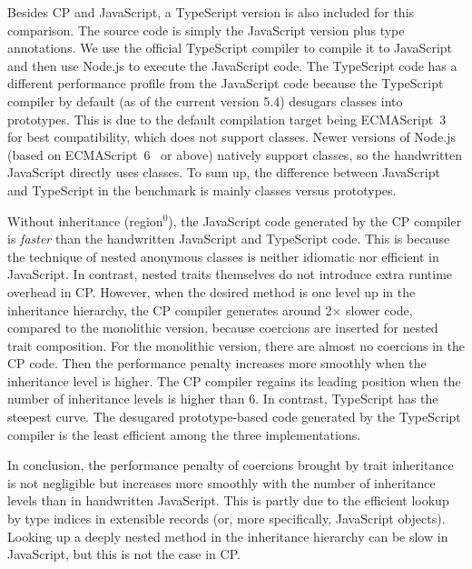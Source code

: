 Besides CP and JavaScript, a TypeScript version is also included for this
comparison. The source code is simply the JavaScript version plus type
annotations. We use the official TypeScript compiler to compile it to JavaScript
and then use Node.js to execute the JavaScript code. The TypeScript code has a
different performance profile from the JavaScript code because the TypeScript
compiler by default (as of the current version 5.4) desugars classes into
prototypes. This is due to the default compilation target being
ECMAScript~3~\citep{es3} for best compatibility, which does not support classes.
Newer versions of Node.js (based on ECMAScript~6~\citep{es6} or above) natively
support classes, so the handwritten JavaScript directly uses classes. To sum up,
the difference between JavaScript and TypeScript in the benchmark is mainly
classes versus prototypes. 

Without inheritance (\textsf{region}$^0$), the JavaScript code generated by the
CP compiler is \emph{faster} than the handwritten JavaScript and TypeScript
code. This is because the technique of nested anonymous classes is neither
idiomatic nor efficient in JavaScript. In contrast, nested traits themselves do
not introduce extra runtime overhead in CP. However, when the desired method is
one level up in the inheritance hierarchy, the CP compiler generates around
2$\times$ slower code, compared to the monolithic version, because coercions are
inserted for nested trait composition. For the monolithic version, there are
almost no coercions in the CP code. Then the performance penalty increases more
smoothly when the inheritance level is higher. The CP compiler regains its
leading position when the number of inheritance levels is higher than 6. In
contrast, TypeScript has the steepest curve. The desugared prototype-based code
generated by the TypeScript compiler is the least efficient among the three
implementations.

In conclusion, the performance penalty of coercions brought by trait inheritance
is not negligible but increases more smoothly with the number of inheritance
levels than in handwritten JavaScript. This is partly due to the efficient
lookup by type indices in extensible records (or, more specifically, JavaScript
objects). Looking up a deeply nested method in the inheritance hierarchy can be
slow in JavaScript, but this is not the case in CP.
